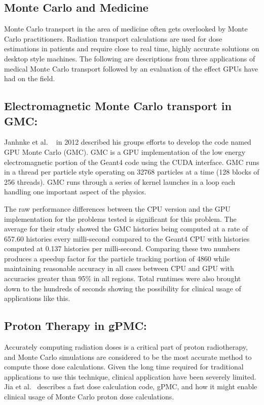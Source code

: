 \subsection{\textbf{Monte Carlo and Medicine}}

Monte Carlo transport in the area of medicine often gets overlooked by Monte Carlo practitioners.
%
Radiation transport calculations are used for dose estimations in patients and require close to real time, highly accurate solutions on desktop style machines.
%
The following are descriptions from three applications of medical Monte Carlo transport followed by an evaluation of the effect GPUs have had on the field.

\subsection*{ \textbf{Electromagnetic Monte Carlo transport in GMC}:}

Janhnke et al. ~\cite{jahnke2012gmc} in 2012 described his groups efforts to develop the code named GPU Monte Carlo (GMC).
%
GMC is a GPU implementation of the low energy electromagnetic portion of the Geant4 code using the CUDA interface.
%
GMC runs in a thread per particle style operating on 32768 particles at a time (128 blocks of 256 threads).
%
GMC runs through a series of kernel launches in a loop each handling one important aspect of the physics.

The raw performance differences between the CPU version and the GPU implementation for the problems tested is significant for this problem.
%
The average for their study showed the GMC histories being computed at a rate of 657.60 histories every milli-second compared to the Geant4 CPU with histories computed at 0.137 histories per milli-second.
%
Comparing these two numbers produces a speedup factor for the particle tracking portion of 4860 while maintaining reasonable accuracy in all cases between CPU and GPU with accuracies greater than 95\% in all regions.
%
Total runtimes were also brought down to the hundreds of seconds showing the possibility for clinical usage of applications like this.~\cite{jahnke2012gmc}

\subsection*{\textbf{Proton Therapy in gPMC}:}

Accurately computing radiation doses is a critical part of proton radiotherapy, and Monte Carlo simulations are considered to be the most accurate method to compute those dose calculations.
%
Given the long time required for traditional applications to use this technique, clinical application have been severely limited.
%
Jia et al.~\cite{jia2012gpu} describes a fast dose calculation code, gPMC, and how it might enable clinical usage of Monte Carlo proton dose calculations.

